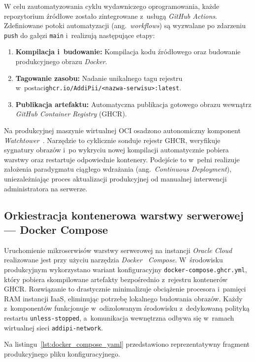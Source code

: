 \documentclass[a4paper,12pt,reqno]{article}
\begin{document}
W celu zautomatyzowania cyklu wydawniczego oprogramowania, każde repozytorium źródłowe zostało zintegrowane z~usługą \textit{GitHub Actions}. Zdefiniowane potoki automatyzacji (ang.~\textit{workflows}) są wyzwalane po zdarzeniu \texttt{push} do gałęzi \texttt{main} i~realizują następujące etapy:
\begin{enumerate}[noitemsep,topsep=3pt]
	\item \textbf{Kompilacja i~budowanie:} Kompilacja kodu źródłowego oraz budowanie produkcyjnego obrazu \textit{Docker}.
	\item \textbf{Tagowanie zasobu:} Nadanie unikalnego tagu rejestru w~postaci\newline \texttt{ghcr.io/AddiPii/<nazwa-serwisu>:latest}.
	\item \textbf{Publikacja artefaktu:} Automatyczna publikacja gotowego obrazu wewnątrz \textit{GitHub Container Registry} (GHCR).
\end{enumerate}

Na produkcyjnej maszynie wirtualnej OCI osadzono autonomiczny komponent \textit{Watchtower}~\cite{watchtower}. Narzędzie to cyklicznie sonduje rejestr GHCR, weryfikuje sygnatury obrazów i~po wykryciu nowej kompilacji automatycznie pobiera warstwy oraz restartuje odpowiednie kontenery. Podejście to w~pełni realizuje założenia paradygmatu ciągłego wdrażania (ang.~\textit{Continuous Deployment}), uniezależniając proces aktualizacji produkcyjnej od manualnej interwencji administratora na serwerze.


\subsection{Orkiestracja kontenerowa warstwy serwerowej --- Docker Compose}

Uruchomienie mikroserwisów warstwy serwerowej na instancji \textit{Oracle Cloud} realizowane jest przy użyciu narzędzia \textit{Docker~\cite{docker} Compose}. W~środowisku produkcyjnym wykorzystano wariant konfiguracyjny \texttt{docker-compose.ghcr.yml}, który pobiera skompilowane artefakty bezpośrednio z~rejestru kontenerów GHCR. Rozwiązanie to drastycznie minimalizuje obciążenie procesora i~pamięci RAM instancji IaaS, eliminując potrzebę lokalnego budowania obrazów. Każdy z~komponentów funkcjonuje w~odizolowanym środowisku z~dedykowaną polityką restartu \texttt{unless-stopped}, a~komunikacja wewnętrzna odbywa się w~ramach wirtualnej sieci \texttt{addipi-network}. 

Na listingu~\ref{lst:docker_compose_yaml} przedstawiono reprezentatywny fragment produkcyjnego pliku konfiguracyjnego.
\end{document}
